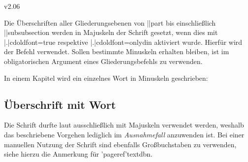 \begin{Entity}{}
\begin{NoIndexDefault}
\begin{Cessations}{v2.06}
\begin{Cessation}
\begin{Cessation}
\begin{Cessation}
\begin{Cessation}
\begin{Cessation}
\begin{Cessation}
\begin{Cessation}
\begin{Cessation}
\begin{Cessation}
\begin{Cessation}
\begin{Cessation}
\begin{Cessation}
\begin{Cessation}
\begin{Cessation}
\begin{Cessation}
\begin{Cessation}
\begin{Cessation}
\begin{Cessation}
\end{Cessation}
\end{Cessation}
\end{Cessation}
\end{Cessation}
\end{Cessation}
\end{Cessation}
\end{Cessation}
\end{Cessation}
\end{Cessation}
\end{Cessation}
\end{Cessation}
\end{Cessation}
\end{Cessation}
\end{Cessation}
\end{Cessation}
\end{Cessation}
\end{Cessation}
\end{Cessation}


%
Die Überschriften aller Gliederungsebenen von \Macro||{part} bis einschließlich 
\Macro||{subsubsection} werden in Majuskeln der Schrift \DIN gesetzt, wenn dies 
mit \Option|.|{cdoldfont=true} respektive \Option|.|{cdoldfont=onlydin} 
aktiviert wurde. Hierfür wird der Befehl  verwendet. 
Sollen bestimmte Minuskeln erhalten bleiben, ist  im 
obligatorischen Argument eines Gliederungsbefehls zu verwenden.
%
\begin{Example}
In einem Kapitel wird ein einzelnes Wort in Minuskeln geschrieben:
\begin{Code}[escapechar=§]
\chapter{Überschrift mit  Wort}
\end{Code}
\end{Example}
%
Die Schrift \DIN durfte laut \CD ausschließlich mit Majuskeln verwendet werden, 
weshalb das beschriebene Vorgehen lediglich im \emph{Ausnahmefall} anzuwenden 
ist. Bei einer manuellen Nutzung der Schrift sind ebenfalls Großbuchstaben zu 
verwenden, siehe hierzu die Anmerkung für \Macro'pageref'{textdbn}.%
%
\end{Cessations}
\end{NoIndexDefault}
\end{Entity}
